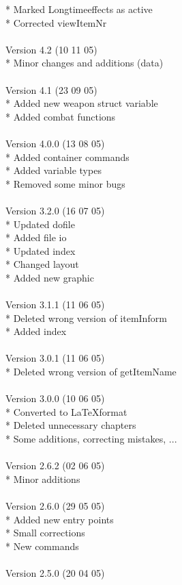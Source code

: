\documentclass[a4paper,10pt,makeidx]{scrreprt}
\begin{document}
* Marked Longtimeeffects as active\\
* Corrected viewItemNr\\
\\
Version 4.2 (10 11 05)\\
* Minor changes and additions (data)\\
\\
Version 4.1 (23 09 05)\\
* Added new weapon struct variable\\
* Added combat functions\\
\\
Version 4.0.0 (13 08 05)\\
* Added container commands\\
* Added variable types\\
* Removed some minor bugs\\
\\
Version 3.2.0 (16 07 05)\\
* Updated dofile\\
* Added file io\\
* Updated index\\
* Changed layout\\
* Added new graphic\\
\\
Version 3.1.1 (11 06 05)\\
* Deleted wrong version of itemInform\\
* Added index\\
\\
Version 3.0.1 (11 06 05)\\
* Deleted wrong version of getItemName\\
\\
Version 3.0.0 (10 06 05)\\
* Converted to \LaTeX format\\
* Deleted unnecessary chapters\\
* Some additions, correcting mistakes, ...\\
\\
Version 2.6.2 (02 06 05)\\
* Minor additions\\
\\
Version 2.6.0 (29 05 05)\\
* Added new entry points\\
* Small corrections\\
* New commands\\
\\
Version 2.5.0 (20 04 05)\\
\end{document}
